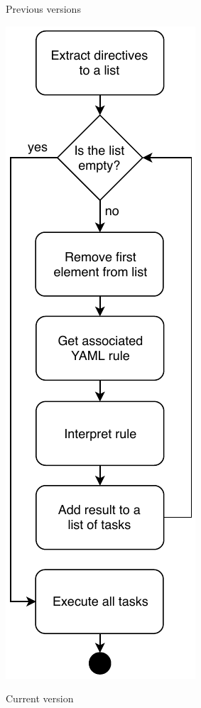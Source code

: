 \begin{figure}[htbp]
\begin{minipage}[t]{0.50\textwidth}
\centering
Previous versions

\vspace{1em}
\includegraphics[scale=1]{figures/v3diagram.pdf}
\end{minipage}%
\begin{minipage}[t]{0.50\textwidth}
\centering
Current version


\end{minipage}
\end{figure}
